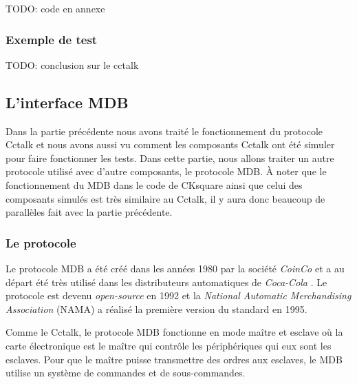 \documentclass[a4paper]{article}
\begin{document}
TODO: code en annexe

\subsubsection{Exemple de test}

TODO: conclusion sur le cctalk

\subsection{L'interface MDB}%

Dans la partie précédente nous avons traité le fonctionnement du protocole
Cctalk et nous avons aussi vu comment les composants Cctalk ont été simuler pour
faire fonctionner les tests. Dans cette partie, nous allons traiter un autre
protocole utilisé avec d'autre composants, le protocole MDB. À noter que le
fonctionnement du MDB dans le code de CKsquare ainsi que celui des composants
simulés est très similaire au Cctalk, il y aura donc beaucoup de parallèles fait
avec la partie précédente.

\subsubsection{Le protocole}

Le protocole MDB a été créé dans les années 1980 par la société \textit{CoinCo}
et a au départ été très utilisé dans les distributeurs automatiques de
\textit{Coca-Cola} \cite{enwiki:1094073752}. Le protocole est devenu
\textit{open-source} en 1992 et la \textit{National Automatic Merchandising
Association} (NAMA) a réalisé la première version du standard en 1995.

Comme le Cctalk, le protocole MDB fonctionne en mode maître et esclave où la
carte électronique est le maître qui contrôle les périphériques qui eux sont les
esclaves. Pour que le maître puisse transmettre des ordres aux esclaves, le MDB
utilise un système de commandes et de sous-commandes.
\end{document}
